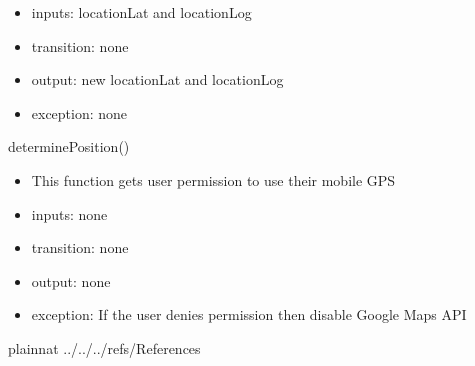 \documentclass[12pt, titlepage]{article}
\begin{document}

\begin{itemize}
\item inputs: locationLat and locationLog
\item transition: none
\item output: new locationLat and locationLog
\item exception: none
\end{itemize}

\noindent determinePosition()
\begin{itemize}
\item This function gets user permission to use their mobile GPS
\end{itemize}

\begin{itemize}
\item inputs: none
\item transition: none
\item output: none
\item exception: If the user denies permission then disable Google Maps API 
\end{itemize}




\newpage

 {plainnat}
 {../../../refs/References}



\end{document}
